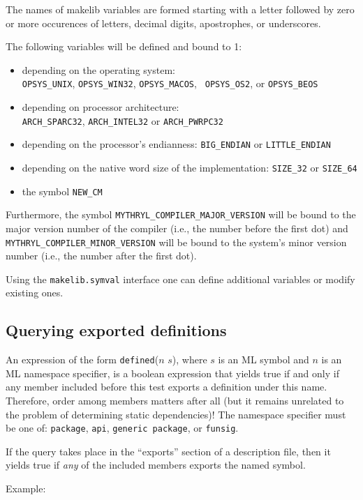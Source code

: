 The names of makelib variables are formed starting with a letter followed
by zero or more occurences of letters, decimal digits, apostrophes, or
underscores.

The following variables will be defined and bound to 1:
\begin{itemize}
\item depending on the operating system: \\
{\tt OPSYS\_UNIX}, {\tt OPSYS\_WIN32}, {\tt OPSYS\_MACOS}, {\tt
OPSYS\_OS2}, or {\tt OPSYS\_BEOS}
\item depending on processor architecture: \\
{\tt ARCH\_SPARC32}, {\tt ARCH\_INTEL32} or {\tt ARCH\_PWRPC32}
\item depending on the processor's endianness:
{\tt BIG\_ENDIAN} or {\tt LITTLE\_ENDIAN}
\item depending on the native word size of the implementation:
{\tt SIZE\_32} or {\tt SIZE\_64}
\item the symbol {\tt NEW\_CM}
\end{itemize}

Furthermore, the symbol {\tt MYTHRYL\_COMPILER\_MAJOR\_VERSION} will be bound to the
major version number of the compiler (i.e., the number before the first dot)
and {\tt MYTHRYL\_COMPILER\_MINOR\_VERSION} will be bound to the system's minor
version number (i.e., the number after the first dot).

Using the {\tt makelib.symval} interface one can define additional
variables or modify existing ones.

\subsection{Querying exported definitions}

An expression of the form {\tt defined}($n$ $s$), where $s$ is an ML
symbol and $n$ is an ML namespace specifier, is a boolean expression
that yields true if and only if any member included before this test
exports a definition under this name.  Therefore, order among members
matters after all (but it remains unrelated to the problem of
determining static dependencies)!  The namespace specifier must be one
of: {\tt package}, {\tt api}, {\tt generic package}, or {\tt funsig}.

If the query takes place in the ``exports'' section of a description
file, then it yields true if {\em any} of the included members exports
the named symbol.

\noindent Example:

